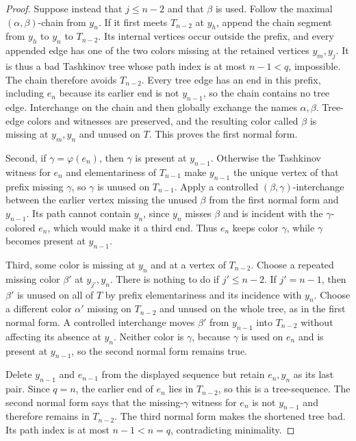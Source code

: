 \begin{proof}
Suppose instead that $j\leq n-2$ and that $\beta$ is used.  Follow the
maximal $(\alpha,\beta)$-chain from $y_n$.  If it first meets $T_{n-2}$ at
$y_h$, append the chain segment from $y_h$ to $y_n$ to $T_{n-2}$.  Its
internal vertices occur outside the prefix, and every appended edge has one
of the two colors missing at the retained vertices $y_m,y_j$.  It is thus a
bad Tashkinov tree whose path index is at most $n-1<q$, impossible.  The
chain therefore avoids $T_{n-2}$.  Every tree edge has an end in this prefix,
including $e_n$ because its earlier end is not $y_{n-1}$, so the chain
contains no tree edge.  Interchange on the chain and then globally exchange
the names $\alpha,\beta$.  Tree-edge colors and witnesses are preserved,
and the resulting color called $\beta$ is missing at $y_m,y_n$ and unused
on $T$.  This proves the first normal form.

Second, if $\gamma=\varphi(e_n)$, then $\gamma$ is present at $y_{n-1}$.
Otherwise the Tashkinov witness for $e_n$ and elementariness of $T_{n-1}$
make $y_{n-1}$ the unique vertex of that prefix missing $\gamma$, so
$\gamma$ is unused on $T_{n-1}$.  Apply a controlled
$(\beta,\gamma)$-interchange between the earlier vertex missing the unused
$\beta$ from the first normal form and $y_{n-1}$.  Its path cannot contain
$y_n$, since $y_n$ misses $\beta$ and is incident with the
$\gamma$-colored $e_n$, which would make it a third end.  Thus $e_n$ keeps
color $\gamma$, while $\gamma$ becomes present at $y_{n-1}$.

Third, some color is missing at $y_n$ and at a vertex of $T_{n-2}$.  Choose
a repeated missing color $\beta'$ at $y_{j'},y_n$.  There is nothing to do
if $j'\leq n-2$.  If $j'=n-1$, then $\beta'$ is unused on all of $T$ by
prefix elementariness and its incidence with $y_n$.  Choose a different
color $\alpha'$ missing on $T_{n-2}$ and unused on the whole tree, as in the
first normal form.  A controlled interchange moves $\beta'$ from
$y_{n-1}$ into $T_{n-2}$ without affecting its absence at $y_n$.  Neither
color is $\gamma$, because $\gamma$ is used on $e_n$ and is present at
$y_{n-1}$, so the second normal form remains true.

Delete $y_{n-1}$ and $e_{n-1}$ from the displayed sequence but retain
$e_n,y_n$ as its last pair.  Since $q=n$, the earlier end of $e_n$ lies in
$T_{n-2}$, so this is a tree-sequence.  The second normal form says that the
missing-$\gamma$ witness for $e_n$ is not $y_{n-1}$ and therefore remains
in $T_{n-2}$.  The third normal form makes the shortened tree bad.  Its path
index is at most $n-1<n=q$, contradicting minimality.


\end{proof}
